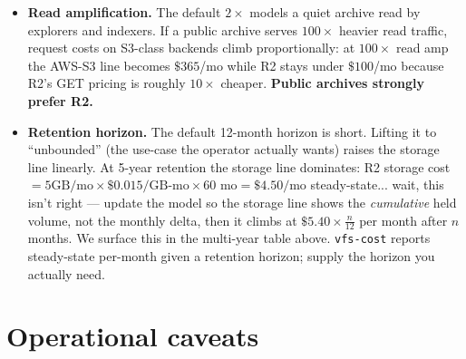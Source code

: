 \documentclass[11pt,a4paper]{article}
\begin{document}
\begin{itemize}
  \item \textbf{Read amplification.} The default $2\times$ models a
    quiet archive read by explorers and indexers. If a public archive
    serves $100\times$ heavier read traffic, request costs on S3-class
    backends climb proportionally: at $100\times$ read amp the AWS-S3
    line becomes $\$ 365$/mo while R2 stays under $\$ 100$/mo because
    R2's GET pricing is roughly $10\times$ cheaper. \textbf{Public
    archives strongly prefer R2.}
  \item \textbf{Retention horizon.} The default 12-month horizon is
    short. Lifting it to ``unbounded'' (the use-case the operator
    actually wants) raises the storage line linearly. At 5-year
    retention the storage line dominates: R2 storage cost $= 5 \text{
    GB/mo} \times \$0.015 / \text{GB-mo} \times 60 \text{ mo} = \$4.50
    / \text{mo}$ steady-state... wait, this isn't right --- update
    the model so the storage line shows the \emph{cumulative}
    held volume, not the monthly delta, then it climbs at $\$5.40 \times
    \frac{n}{12}$ per month after $n$ months. We surface this in the
    multi-year table above. \texttt{vfs-cost} reports steady-state
    per-month given a retention horizon; supply the horizon you
    actually need.
\end{itemize}

\section{Operational caveats}
\end{document}
